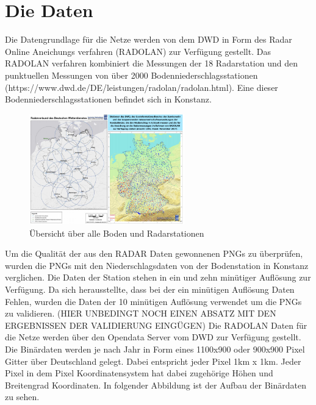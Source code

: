 \section{Die Daten}\label{die daten}
Die Datengrundlage für die Netze werden von dem DWD in Form des Radar Online Aneichungs verfahren (RADOLAN) zur Verfügung gestellt. 
Das RADOLAN verfahren kombiniert die Messungen der 18 Radarstation und den punktuellen Messungen von über 2000 Bodenniederschlagsstationen (https://www.dwd.de/DE/leistungen/radolan/radolan.html). 
Eine dieser Bodenniederschlagsstationen befindet sich in Konstanz. 

\begin{figure}[htb]
 \centering
 \includegraphics[width=0.6\textwidth,angle=0]{abb/daten_stationsuebersicht}
 \caption[Stationen Übersicht]{Übersicht über alle Boden und Radarstationen}
\label{fig:daten_stationsuebersicht}
\end{figure}

Um die Qualität der aus den RADAR Daten gewonnenen PNGs zu überprüfen, wurden die PNGs mit den Niederschlagsdaten von der 
Bodenstation in Konstanz verglichen. 
Die Daten der Station stehen in ein und zehn minütiger Auflösung zur Verfügung. 
Da sich herausstellte, dass bei der ein minütigen Auflösung Daten Fehlen, wurden die Daten der 10 minütigen Auflösung 
verwendet um die PNGs zu validieren. (HIER UNBEDINGT NOCH EINEN ABSATZ MIT DEN ERGEBNISSEN DER VALIDIERUNG EINGÜGEN)
Die RADOLAN Daten für die Netze werden über den Opendata Server vom DWD zur Verfügung gestellt. 
Die Binärdaten werden je nach Jahr in Form eines 1100x900 oder 900x900 Pixel Gitter über Deutschland gelegt.  
Dabei entspricht jeder Pixel 1km x 1km. Jeder Pixel in dem Pixel Koordinatensystem hat dabei zugehörige Höhen und 
Breitengrad Koordinaten. In folgender Abbildung ist der Aufbau der Binärdaten zu sehen.

